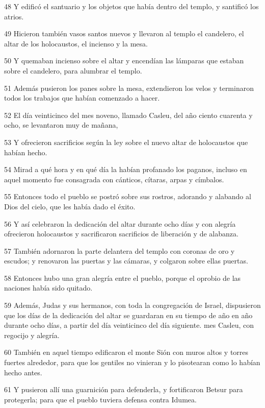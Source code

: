 \par 48 Y edificó el santuario y los objetos que había dentro del templo, y santificó los atrios.
\par 49 Hicieron también vasos santos nuevos y llevaron al templo el candelero, el altar de los holocaustos, el incienso y la mesa.
\par 50 Y quemaban incienso sobre el altar y encendían las lámparas que estaban sobre el candelero, para alumbrar el templo.
\par 51 Además pusieron los panes sobre la mesa, extendieron los velos y terminaron todos los trabajos que habían comenzado a hacer.
\par 52 El día veinticinco del mes noveno, llamado Casleu, del año ciento cuarenta y ocho, se levantaron muy de mañana,
\par 53 Y ofrecieron sacrificios según la ley sobre el nuevo altar de holocaustos que habían hecho.
\par 54 Mirad a qué hora y en qué día la habían profanado los paganos, incluso en aquel momento fue consagrada con cánticos, cítaras, arpas y címbalos.
\par 55 Entonces todo el pueblo se postró sobre sus rostros, adorando y alabando al Dios del cielo, que les había dado el éxito.
\par 56 Y así celebraron la dedicación del altar durante ocho días y con alegría ofrecieron holocaustos y sacrificaron sacrificios de liberación y de alabanza.
\par 57 También adornaron la parte delantera del templo con coronas de oro y escudos; y renovaron las puertas y las cámaras, y colgaron sobre ellas puertas.
\par 58 Entonces hubo una gran alegría entre el pueblo, porque el oprobio de las naciones había sido quitado.
\par 59 Además, Judas y sus hermanos, con toda la congregación de Israel, dispusieron que los días de la dedicación del altar se guardaran en su tiempo de año en año durante ocho días, a partir del día veinticinco del día siguiente. mes Casleu, con regocijo y alegría.
\par 60 También en aquel tiempo edificaron el monte Sión con muros altos y torres fuertes alrededor, para que los gentiles no vinieran y lo pisotearan como lo habían hecho antes.
\par 61 Y pusieron allí una guarnición para defenderla, y fortificaron Betsur para protegerla; para que el pueblo tuviera defensa contra Idumea.

